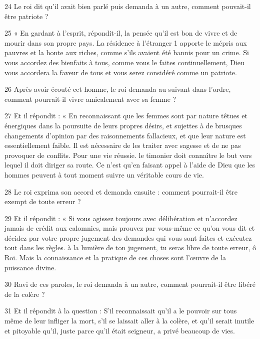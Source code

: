 \par 24 Le roi dit qu'il avait bien parlé puis demanda à un autre, comment pouvait-il être patriote ?

\par 25 « En gardant à l'esprit, répondit-il, la pensée qu'il est bon de vivre et de mourir dans son propre pays. La résidence à l'étranger 1 apporte le mépris aux pauvres et la honte aux riches, comme s'ils avaient été bannis pour un crime. Si vous accordez des bienfaits à tous, comme vous le faites continuellement, Dieu vous accordera la faveur de tous et vous serez considéré comme un patriote.

\par 26 Après avoir écouté cet homme, le roi demanda au suivant dans l'ordre, comment pourrait-il vivre amicalement avec sa femme ?

\par 27 Et il répondit : « En reconnaissant que les femmes sont par nature têtues et énergiques dans la poursuite de leurs propres désirs, et sujettes à de brusques changements d'opinion par des raisonnements fallacieux, et que leur nature est essentiellement faible. Il est nécessaire de les traiter avec sagesse et de ne pas provoquer de conflits. Pour une vie réussie. le timonier doit connaître le but vers lequel il doit diriger sa route. Ce n'est qu'en faisant appel à l'aide de Dieu que les hommes peuvent à tout moment suivre un véritable cours de vie.

\par 28 Le roi exprima son accord et demanda ensuite : comment pourrait-il être exempt de toute erreur ?

\par 29 Et il répondit : « Si vous agissez toujours avec délibération et n'accordez jamais de crédit aux calomnies, mais prouvez par vous-même ce qu'on vous dit et décidez par votre propre jugement des demandes qui vous sont faites et exécutez tout dans les règles. à la lumière de ton jugement, tu seras libre de toute erreur, ô Roi. Mais la connaissance et la pratique de ces choses sont l'œuvre de la puissance divine.

\par 30 Ravi de ces paroles, le roi demanda à un autre, comment pourrait-il être libéré de la colère ?

\par 31 Et il répondit à la question : S'il reconnaissait qu'il a le pouvoir sur tous même de leur infliger la mort, s'il se laissait aller à la colère, et qu'il serait inutile et pitoyable qu'il, juste parce qu'il était seigneur, a privé beaucoup de vies.

